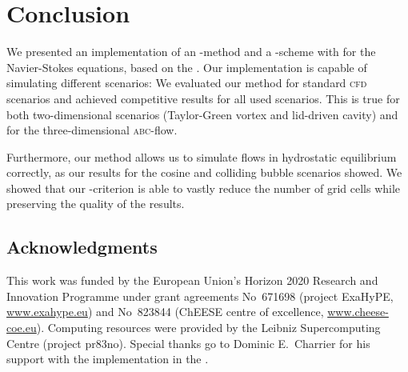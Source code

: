 \documentclass[runningheads]{llncs}
\begin{document}
\section{Conclusion}
We presented an implementation of an \aderdg{}-method and a \muscl{}-scheme with \amr{} for the Navier-Stokes equations, based on the \exahypeengine.
Our implementation is capable of simulating different scenarios:
We evaluated our method for standard \textsc{cfd} scenarios and achieved competitive results for all used scenarios.
This is true for both two-dimensional scenarios (Taylor-Green vortex and lid-driven cavity) and for the three-dimensional \textsc{abc}-flow.

Furthermore, our method allows us to simulate flows in hydrostatic equilibrium correctly, as our results for the cosine and colliding bubble scenarios showed.
We showed that our \amr{}-criterion is able to vastly reduce the number of grid cells while preserving the quality of the results.

\subsection*{Acknowledgments}
This work was funded by the European Union’s Horizon 2020 Research and Innovation Programme under grant agreements 
No~671698 (project ExaHyPE, \url{www.exahype.eu}) and 
No~823844 (ChEESE centre of excellence, \url{www.cheese-coe.eu}).
Computing resources were provided by the Leibniz Supercomputing Centre (project pr83no).
Special thanks go to Dominic E.\ Charrier for his support with the implementation in the \exahypeengine{}.

%

{}
\end{document}
